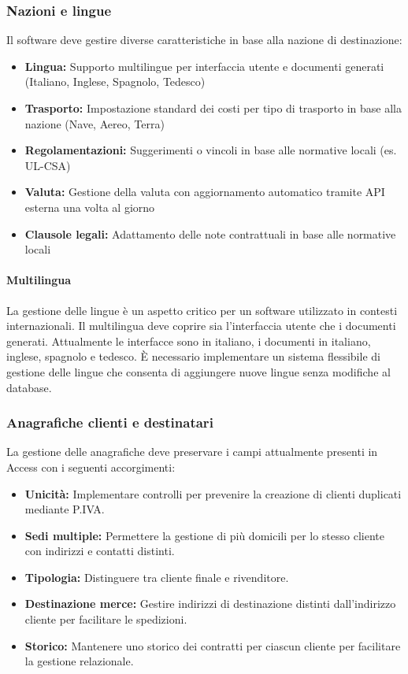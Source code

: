 \documentclass[12pt, a4paper]{article}
\begin{document}
\subsubsection{Nazioni e lingue}

Il software deve gestire diverse caratteristiche in base alla nazione di destinazione:

\begin{itemize}
      \item \textbf{Lingua:} Supporto multilingue per interfaccia utente e documenti generati (Italiano, Inglese, Spagnolo, Tedesco)
      \item \textbf{Trasporto:} Impostazione standard dei costi per tipo di trasporto in base alla nazione (Nave, Aereo, Terra)
      \item \textbf{Regolamentazioni:} Suggerimenti o vincoli in base alle normative locali (es. UL-CSA)
      \item \textbf{Valuta:} Gestione della valuta con aggiornamento automatico tramite API esterna una volta al giorno
      \item \textbf{Clausole legali:} Adattamento delle note contrattuali in base alle normative locali
\end{itemize}

\paragraph{Multilingua}
La gestione delle lingue è un aspetto critico per un software utilizzato in contesti internazionali.
Il multilingua deve coprire sia l'interfaccia utente che i documenti generati.
Attualmente le interfacce sono in italiano, i documenti in italiano, inglese, spagnolo e tedesco.
È necessario implementare un sistema flessibile di gestione delle lingue che consenta di aggiungere nuove lingue senza modifiche al database.

\subsubsection{Anagrafiche clienti e destinatari}

La gestione delle anagrafiche deve preservare i campi attualmente presenti in Access con i seguenti accorgimenti:

\begin{itemize}
      \item \textbf{Unicità:} Implementare controlli per prevenire la creazione di clienti duplicati mediante P.IVA.
      \item \textbf{Sedi multiple:} Permettere la gestione di più domicili per lo stesso cliente con indirizzi e contatti distinti.
      \item \textbf{Tipologia:} Distinguere tra cliente finale e rivenditore.
      \item \textbf{Destinazione merce:} Gestire indirizzi di destinazione distinti dall'indirizzo cliente per facilitare le spedizioni.
      \item \textbf{Storico:} Mantenere uno storico dei contratti per ciascun cliente per facilitare la gestione relazionale.
\end{itemize}
\end{document}
